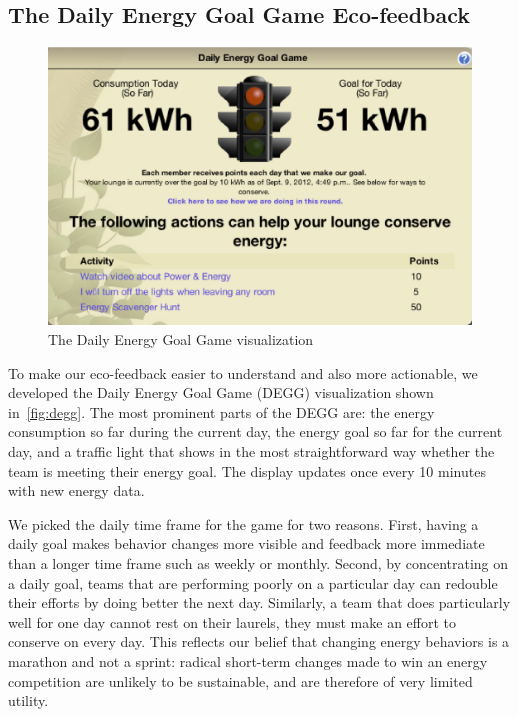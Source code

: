 \documentclass{sigchi}
\begin{document}
\subsection{The Daily Energy Goal Game Eco-feedback}
\label{sec:simple-viz}

\begin{figure}[!t]
\centering
\includegraphics[width=0.95\columnwidth]{degg.eps}
\caption{The Daily Energy Goal Game visualization}
\label{fig:degg}
\end{figure}

To make our eco-feedback easier to understand and also more actionable, we developed the Daily Energy Goal Game (DEGG) visualization shown in~\autoref{fig:degg}. The most prominent parts of the DEGG are: the energy consumption so far during the current day, the energy goal so far for the current day, and a traffic light that shows in the most straightforward way whether the team is meeting their energy goal. The display updates once every 10 minutes with new energy data.

We picked the daily time frame for the game for two reasons. First, having a daily goal makes behavior changes more visible and feedback more immediate than a longer time frame such as weekly or monthly. Second, by concentrating on a daily goal, teams that are performing poorly on a particular day can redouble their efforts by doing better the next day. Similarly, a team that does particularly well for one day cannot rest on their laurels, they must make an effort to conserve on every day. This reflects our belief that changing energy behaviors is a marathon and not a sprint: radical short-term changes made to win an energy competition are unlikely to be sustainable, and are therefore of very limited utility.
\end{document}
